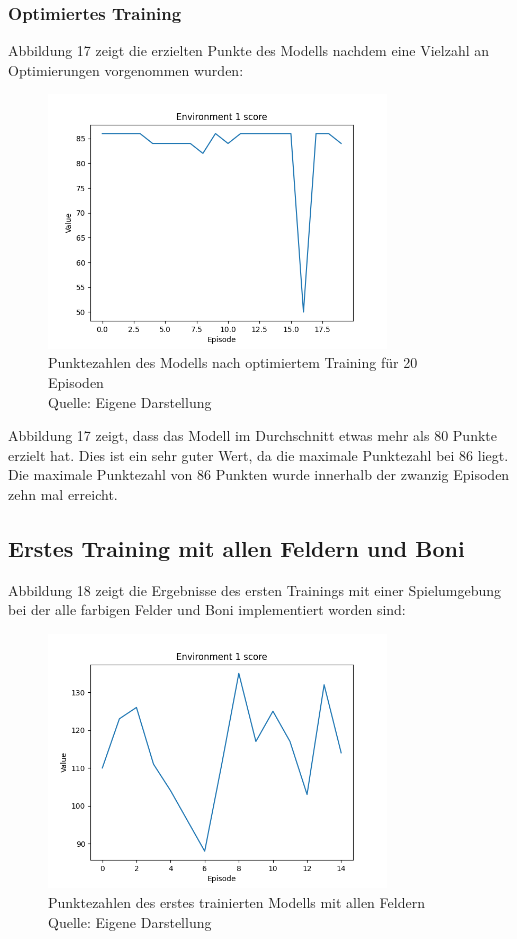 \subsubsection{Optimiertes Training}
Abbildung 17 zeigt die erzielten Punkte des Modells nachdem eine Vielzahl an Optimierungen vorgenommen wurden:
\nopagebreak
\begin{figure}[H]
	\centering
	\includegraphics[width=0.8\textwidth]{Bilder/optimizetraining} 
	\caption[Punktezahlen des Modells nach optimiertem Training für 20 Episoden]{Punktezahlen des Modells nach optimiertem Training für 20 Episoden\\ Quelle: Eigene Darstellung}
\end{figure}

Abbildung 17 zeigt, dass das Modell im Durchschnitt etwas mehr als 80 Punkte erzielt hat. Dies ist ein sehr guter Wert, da die maximale Punktezahl bei 86 liegt. Die maximale Punktezahl von 86 Punkten wurde innerhalb der zwanzig Episoden zehn mal erreicht.
\subsection{Erstes Training mit allen Feldern und Boni}
Abbildung 18 zeigt die Ergebnisse des ersten Trainings mit einer Spielumgebung bei der alle farbigen Felder und Boni implementiert worden sind:
\nopagebreak
\begin{figure}[H]
	\centering
	\includegraphics[width=0.8\textwidth]{Bilder/firsttrainingwithallfields} 
	\caption[Punktezahlen des erstes trainierten Modells mit allen Feldern]{Punktezahlen des erstes trainierten Modells mit allen Feldern\\ Quelle: Eigene Darstellung}
\end{figure}

